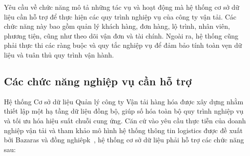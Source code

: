 \documentclass[11pt]{report}
\begin{document}
Yêu cầu về chức năng mô tả những tác vụ và hoạt động mà hệ thống cơ sở dữ liệu cần hỗ trợ để thực hiện các quy trình nghiệp vụ của công ty vận tải. Các chức năng này bao gồm quản lý khách hàng, đơn hàng, lộ trình, nhân viên, phương tiện, cũng như theo dõi vận đơn và tài chính. Ngoài ra, hệ thống cũng phải thực thi các ràng buộc và quy tắc nghiệp vụ để đảm bảo tính toàn vẹn dữ liệu và tuân thủ quy trình vận hành.

\subsection{Các chức năng nghiệp vụ cần hỗ trợ}
Hệ thống Cơ sở dữ liệu Quản lý công ty Vận tải hàng hóa được xây dựng nhằm thiết lập một hạ tầng dữ liệu đồng bộ, giúp số hóa toàn bộ quy trình nghiệp vụ và tối ưu hóa hiệu suất chuỗi cung ứng. Căn cứ vào yêu cầu thực tiễn của doanh nghiệp vận tải và tham khảo mô hình  hệ thống thông tin logistics được đề xuất bởi Bazaras và đồng nghiêpk~\cite{bazaras2024multimodal}, hệ thống cơ sở dữ liệu phải hỗ trợ các chức năng sau:
\end{document}
